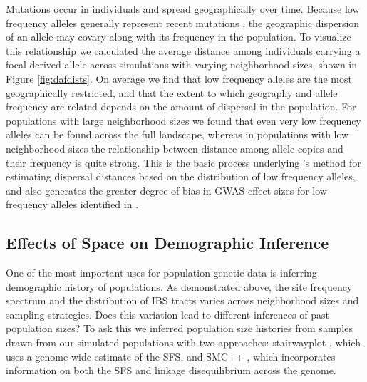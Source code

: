 \documentclass[10pt,twoside,lineno,hidelinks]{preprint}
\begin{document}
Mutations occur in individuals and spread geographically over time. Because low frequency alleles generally represent recent mutations \citep{sawyer1977past, griffiths1999ages}, the geographic dispersion of an allele may covary along with its frequency in the population. To visualize this relationship we calculated the average distance among individuals carrying a focal derived allele across simulations with varying neighborhood sizes, shown in Figure \ref{fig:dafdists}. On average we find that low frequency alleles are the most geographically restricted, and that the extent to which geography and allele frequency are related depends on the amount of dispersal in the population. For populations with large neighborhood sizes we found that even very low frequency alleles can be found across the full landscape, whereas in populations with low neighborhood sizes the relationship between distance among allele copies and their frequency is quite strong. This is the basic process underlying \citeauthor{Novembre2009}'s \citeyearpar{Novembre2009} method for estimating dispersal distances based on the distribution of low frequency alleles, and also generates the greater degree of bias in GWAS effect sizes for low frequency alleles identified in \citet{Mathieson2012}.


\subsection{Effects of Space on Demographic Inference}

One of the most important uses for population genetic data is inferring demographic history of populations. As demonstrated above, the site frequency spectrum and the distribution of IBS tracts varies across neighborhood sizes and sampling strategies. Does this variation lead to different inferences of past population sizes? To ask this we inferred population size histories from samples drawn from our simulated populations with two approaches: stairwayplot \citep{Liu2015}, which uses a genome-wide estimate of the SFS, and SMC++ \citep{Terhorst2016}, which incorporates information on both the SFS and linkage disequilibrium across the genome.
\end{document}
